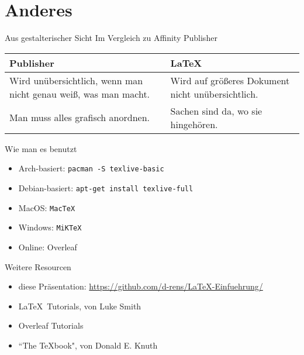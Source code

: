 \section{Anderes}

\begin{frame}{Aus gestalterischer Sicht}
    Im Vergleich zu Affinity Publisher

    \begin{table}[htpb]
        \centering
        \begin{tabular}{p{}|p{}}
            Publisher & \LaTeX \\
            \toprule
            Wird unübersichtlich, wenn man nicht genau weiß, was man macht. & Wird auf größeres Dokument nicht unübersichtlich.\\
            \midrule
            Man muss alles grafisch anordnen. & Sachen sind da, wo sie hingehören.\\
        \end{tabular}
    \end{table}


\end{frame}


\begin{frame}{Wie man es benutzt}
    \begin{itemize}
        \item Arch-basiert: \Verb|pacman -S texlive-basic|
        \item Debian-basiert: \Verb|apt-get install texlive-full|
        \item MacOS: \Verb|MacTeX|
        \item Windows: \Verb|MiKTeX|
        \item Online: Overleaf
    \end{itemize}
\end{frame}




\begin{frame}{Weitere Resourcen}
    \begin{itemize}
        \item diese Pr\"asentation: \url{https://github.com/d-rens/LaTeX-Einfuehrung/}
        \item \LaTeX\ Tutorials, von Luke Smith
        \item Overleaf Tutorials
        \item ``The \TeX book", von Donald E. Knuth
    \end{itemize}
    
\end{frame}




